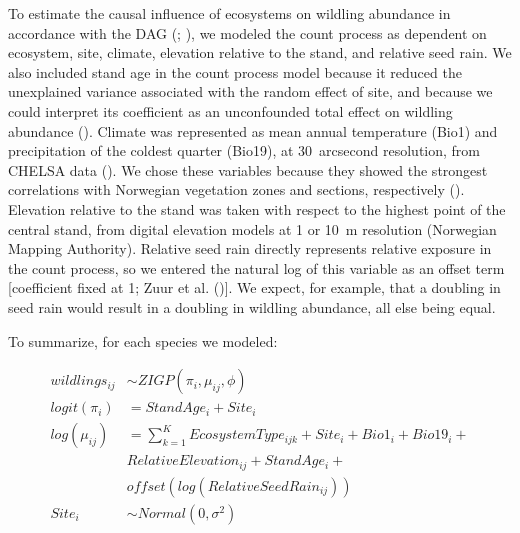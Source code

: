 \documentclass[
]{article}
\begin{document}
To estimate the causal influence of ecosystems on wildling abundance in
accordance with the DAG (; ), we modeled the count process as dependent on
ecosystem, site, climate, elevation relative to the stand, and relative seed
rain. We also included stand age in the count process model because it reduced
the unexplained variance associated with the random effect of site, and because
we could interpret its coefficient as an unconfounded total effect on wildling
abundance (). Climate was represented as
mean annual temperature (Bio1) and precipitation of the coldest quarter (Bio19),
at 30~arcsecond resolution, from CHELSA data
(). We chose these variables because they
showed the strongest correlations with Norwegian vegetation zones and sections,
respectively (). Elevation relative to the
stand was taken with respect to the highest point of the central stand, from
digital elevation models at 1 or 10~m resolution (Norwegian Mapping Authority).
Relative seed rain directly represents relative exposure in the count process,
so we entered the natural log of this variable as an offset term {[}coefficient
fixed at 1; Zuur et al. (){]}. We expect, for example, that a
doubling in seed rain would result in a doubling in wildling abundance, all else
being equal.

To summarize, for each species we modeled:

\begin{equation}
\begin{aligned}
wildlings_{ij} &\sim ZIGP(\pi_{i}, \mu_{ij}, \phi) \\
logit(\pi_{i}) &= StandAge_{i} + Site_{i} \\
log(\mu_{ij}) &= \sum\limits_{k=1}^K EcosystemType_{ijk} + Site_{i} + Bio1_{i} + Bio19_{i} + \\
&RelativeElevation_{ij} + StandAge_{i} + \\
&offset(log(RelativeSeedRain_{ij})) \\
Site_{i} &\sim Normal(0, \sigma^2) \\
\end{aligned}
\end{equation}
\end{document}
